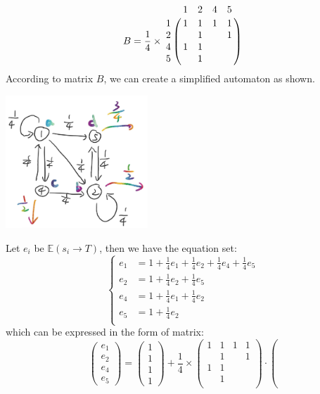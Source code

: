 \documentclass[12pt,a4]{article}
\begin{document}
\begin{solution}
\begin{enumerate}
  $$
  B = \frac{1}{4} \times 
  \bordermatrix{&1 &2 &4 &5 \cr
              1 &1 &1 &1 &1 \cr
              2 &  &1 &  &1 \cr
              4 &1 &1 &  &  \cr
              5 &  &1 &  &  \cr
  }
  $$
  According to matrix $B$, we can create a simplified automaton as shown.
  \begin{center}
   \includegraphics[width=0.4\textwidth]{figures/e33_p2.jpg}
  \end{center}
  Let $e_i$ be $\mathbb{E}(s_i \rightarrow T)$, then we have the equation set:
  $$
  \begin{cases}
  e_1 &=  1 + \frac{1}{4}e_1 + \frac{1}{4}e_2 + \frac{1}{4}e_4 + \frac{1}{4}e_5 \\
  e_2 &=  1 + \frac{1}{4}e_2 + \frac{1}{4}e_5 \\
  e_4 &=  1 + \frac{1}{4}e_1 + \frac{1}{4}e_2 \\
  e_5 &=  1 + \frac{1}{4}e_2 \\
  \end{cases}$$
  which can be expressed in the form of matrix:
  \begin{equation*}
  \left(
  \begin{array}{c}
  e_1 \\ e_2 \\ e_4 \\ e_5
  \end{array}
  \right) = \left(
  \begin{array}{c}
  1 \\ 1 \\ 1 \\ 1
  \end{array}
  \right) + \frac{1}{4} \times 
  \begin{pmatrix}
               1 &1 &1 &1 \\
                 &1 &  &1 \\
               1 &1 &  &  \\
                 &1 &  &  \\
  \end{pmatrix} \cdot 
  \left(

\end{equation*}
\end{enumerate}
\end{solution}
\end{document}
